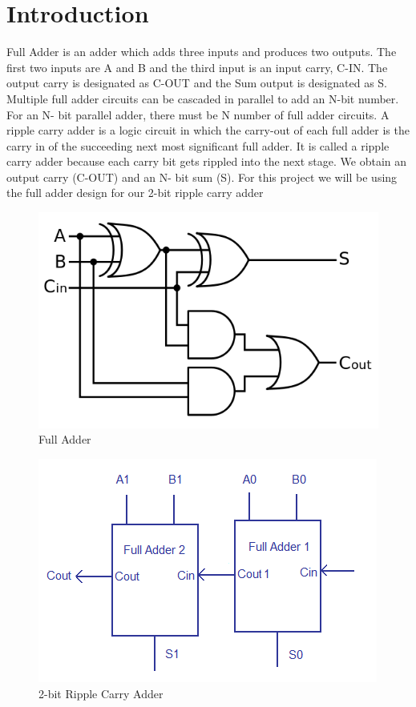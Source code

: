 \documentclass[12pt,singleside,a4paper]{article}
\begin{document}
\section{Introduction}
Full Adder is an adder which adds three inputs and produces two outputs. The first two inputs are A and B and the third input is an input carry, C-IN. The output carry is designated as C-OUT and the Sum output is designated as S.
\newline
\newline
Multiple full adder circuits can be cascaded in parallel to add an N-bit number. For an N- bit parallel adder, there must be N number of full adder circuits. A ripple carry adder is a logic circuit in which the carry-out of each full adder is the carry in of the succeeding next most significant full adder. It is called a ripple carry adder because each carry bit gets rippled into the next  stage. We obtain an output carry (C-OUT) and an N- bit sum (S).
\newline
\newline
For this project we will be using the full adder design for our 2-bit ripple carry adder
\begin{figure}[H]
    \centering
    \includegraphics[scale=0.4]{circuit_diagram.png}
    \caption{Full Adder}
\end{figure}

\begin{figure}[H]
    \centering
    \includegraphics[scale=0.8]{ripple.png}
    \caption{2-bit Ripple Carry Adder}
\end{figure}
\end{document}
